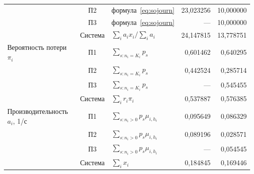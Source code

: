 \begin{longtable}{p{3.6cm}cp{4.2cm}rr}
 & П2 & формула~\eqref{eq:sojourn} & 23{,}023256 & 10{,}000000 \\
 & П3 & формула~\eqref{eq:sojourn} & --- & 10{,}000000 \\
 & Система & $\sum_i a_i x_i/\sum_i a_i$ & 24{,}147815 & 13{,}778751 \\ \hline
Вероятность потери $\pi_i$ & П1 & $\sum_{s:n_i=K_i}p_s$ & 0{,}601462 & 0{,}640295 \\
 & П2 & $\sum_{s:n_i=K_i}p_s$ & 0{,}442524 & 0{,}285714 \\
 & П3 & $\sum_{s:n_i=K_i}p_s$ & --- & 0{,}545455 \\
 & Система & $\sum_i r_i\pi_i$ & 0{,}537887 & 0{,}576385 \\ \hline
Производительность $a_i$, 1/с & П1 & $\sum_{s:n_i>0}p_s\mu_{i,h_i}$ & 0{,}095649 & 0{,}086329 \\
 & П2 & $\sum_{s:n_i>0}p_s\mu_{i,h_i}$ & 0{,}089196 & 0{,}028571 \\
 & П3 & $\sum_{s:n_i>0}p_s\mu_{i,h_i}$ & --- & 0{,}054545 \\
 & Система & $\sum_i x_i$ & 0{,}184845 & 0{,}169446 \\ \hline
\end{longtable}